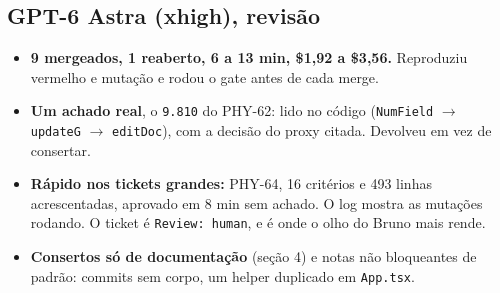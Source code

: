 \documentclass[11pt,a4paper]{article}
\begin{document}
\subsection*{GPT-6 Astra (xhigh), revisão}
\begin{itemize}
  \item \textbf{9 mergeados, 1 reaberto, 6 a 13 min, \$1,92 a \$3,56.}
        Reproduziu vermelho e mutação e rodou o gate antes de cada merge.
  \item \textbf{Um achado real}, o \texttt{9.810} do PHY-62: lido no código
        (\texttt{NumField} $\to$ \texttt{updateG} $\to$ \texttt{editDoc}), com a
        decisão do proxy citada. Devolveu em vez de consertar.
  \item \textbf{Rápido nos tickets grandes:} PHY-64, 16 critérios e 493 linhas
        acrescentadas, aprovado em 8 min sem achado. O log mostra as mutações
        rodando. O ticket é \texttt{Review: human}, e é onde o olho do Bruno
        mais rende.
  \item \textbf{Consertos só de documentação} (seção 4) e notas não bloqueantes
        de padrão: commits sem corpo, um helper duplicado em \texttt{App.tsx}.
\end{itemize}
\end{document}
